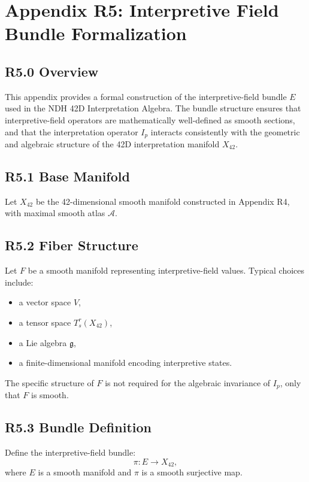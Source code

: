 \appendix
\section*{Appendix R5: Interpretive Field Bundle Formalization}

\subsection*{R5.0 Overview}

This appendix provides a formal construction of the interpretive-field
bundle $E$ used in the NDH 42D Interpretation Algebra. The bundle
structure ensures that interpretive-field operators are mathematically
well-defined as smooth sections, and that the interpretation operator
$I_p$ interacts consistently with the geometric and algebraic structure
of the 42D interpretation manifold $X_{42}$.

\subsection*{R5.1 Base Manifold}

Let $X_{42}$ be the 42-dimensional smooth manifold constructed in
Appendix R4, with maximal smooth atlas $\mathcal{A}$.

\subsection*{R5.2 Fiber Structure}

Let $F$ be a smooth manifold representing interpretive-field values.
Typical choices include:

\begin{itemize}
    \item a vector space $V$,
    \item a tensor space $T^r_s(X_{42})$,
    \item a Lie algebra $\mathfrak{g}$,
    \item a finite-dimensional manifold encoding interpretive states.
\end{itemize}

The specific structure of $F$ is not required for the algebraic
invariance of $I_p$, only that $F$ is smooth.

\subsection*{R5.3 Bundle Definition}

Define the interpretive-field bundle:
\[
\pi : E \to X_{42},
\]
where $E$ is a smooth manifold and $\pi$ is a smooth surjective map.

